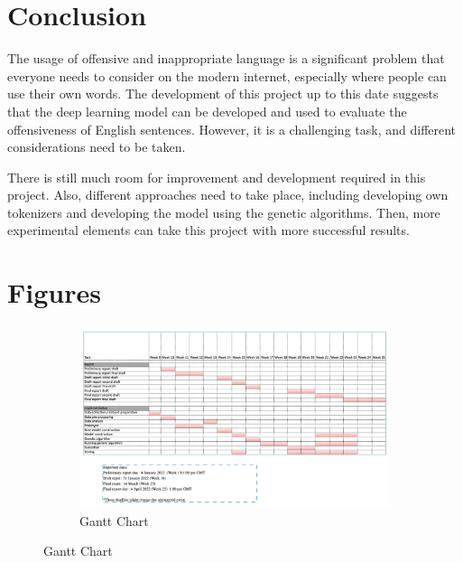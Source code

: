 \documentclass[11pt, natbib=false]{article}
\begin{document}
\section{Conclusion}
The usage of offensive and inappropriate language is a significant problem that everyone needs to consider on the modern internet, especially where people can use their own words.
The development of this project up to this date suggests that the deep learning model can be developed and used to evaluate the offensiveness of English sentences.
However, it is a challenging task, and different considerations need to be taken.

There is still much room for improvement and development required in this project.
Also, different approaches need to take place, including developing own tokenizers and developing the model using the genetic algorithms.
Then, more experimental elements can take this project with more successful results.

\newpage
\printbibliography
\newpage
\section{Figures}
\begin{figure}[h!]
  \centering
  \begin{subfigure}[b]{0.7\linewidth}
    \caption{Gantt Chart}
    \includegraphics[width=\linewidth]{./gantt.png}
  \end{subfigure}


\end{figure}
\end{document}
